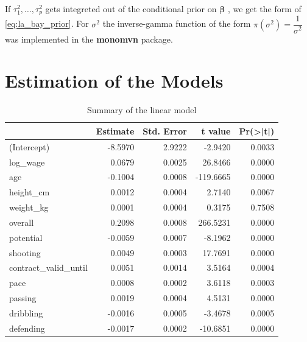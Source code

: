 \documentclass[12pt,a4paper]{article}
\begin{document}
If \(\tau^2_1 , \ldots , \tau^2_p\) gets integreted out of the
conditional prior on \(\pmb{\beta}\) , we get the form of
\eqref{eq:la_bay_prior}. For \(\sigma^2\) the inverse-gamma function of
the form \(\pi \left( \sigma^2 \right) = \dfrac{1}{\sigma^2}\) was
implemented in the \textbf{monomvn} package.

\hypertarget{estimation-of-the-models}{%
\section{Estimation of the Models}\label{estimation-of-the-models}}

\begin{table}[!h]

\caption{\label{tab:unnamed-chunk-4}\label{tab:sum_lm} Summary of the linear model}
\centering
\begin{tabular}[t]{lrrrr}
\toprule
  & Estimate & Std. Error & t value & Pr(>|t|)\\
\midrule
\rowcolor{gray!6}  (Intercept) & -8.5970 & 2.9222 & -2.9420 & 0.0033\\
log\_wage & 0.0679 & 0.0025 & 26.8466 & 0.0000\\
\rowcolor{gray!6}  age & -0.1004 & 0.0008 & -119.6665 & 0.0000\\
height\_cm & 0.0012 & 0.0004 & 2.7140 & 0.0067\\
\rowcolor{gray!6}  weight\_kg & 0.0001 & 0.0004 & 0.3175 & 0.7508\\
overall & 0.2098 & 0.0008 & 266.5231 & 0.0000\\
\rowcolor{gray!6}  potential & -0.0059 & 0.0007 & -8.1962 & 0.0000\\
shooting & 0.0049 & 0.0003 & 17.7691 & 0.0000\\
\rowcolor{gray!6}  contract\_valid\_until & 0.0051 & 0.0014 & 3.5164 & 0.0004\\
pace & 0.0008 & 0.0002 & 3.6118 & 0.0003\\
\rowcolor{gray!6}  passing & 0.0019 & 0.0004 & 4.5131 & 0.0000\\
dribbling & -0.0016 & 0.0005 & -3.4678 & 0.0005\\
\rowcolor{gray!6}  defending & -0.0017 & 0.0002 & -10.6851 & 0.0000\\
\bottomrule
\end{tabular}
\end{table}
\end{document}
